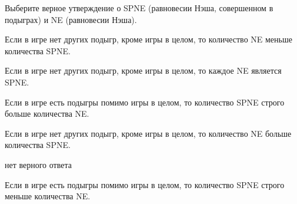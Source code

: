 
\begin{question}
Выберите верное утверждение о SPNE (равновесии Нэша, совершенном в
подыграх) и NE (равновесии Нэша).
\begin{answerlist}
  \item Если в игре нет других подыгр, кроме игры в целом, то количество NE
меньше количества SPNE.
  \item Если в игре нет других подыгр, кроме игры в целом, то каждое NE является
SPNE.
  \item Если в игре есть подыгры помимо игры в целом, то количество SPNE строго
больше количества NE.
  \item Если в игре нет других подыгр, кроме игры в целом, то количество NE
больше количества SPNE.
  \item нет верного ответа
  \item Если в игре есть подыгры помимо игры в целом, то количество SPNE строго
меньше количества NE.
\end{answerlist}
\end{question}


